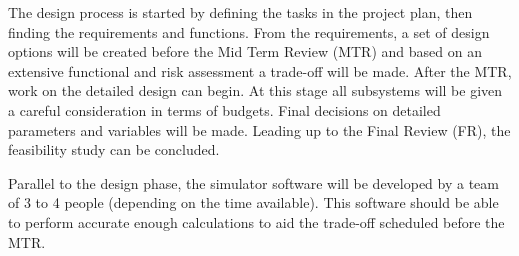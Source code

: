 The design process is started by defining the tasks in the project plan, then finding the requirements and functions. From the requirements, a set of design options will be created before the Mid Term Review (MTR) and based on an extensive functional and risk assessment a trade-off will be made. After the MTR, work on the detailed design can begin. At this stage all subsystems will be given a careful consideration in terms of budgets. Final decisions on detailed parameters and variables will be made. Leading up to the Final Review (FR), the feasibility study can be concluded.

Parallel to the design phase, the simulator software will be developed by a team of 3 to 4 people (depending on the time available). This software should be able to perform accurate enough calculations to aid the trade-off scheduled before the MTR.